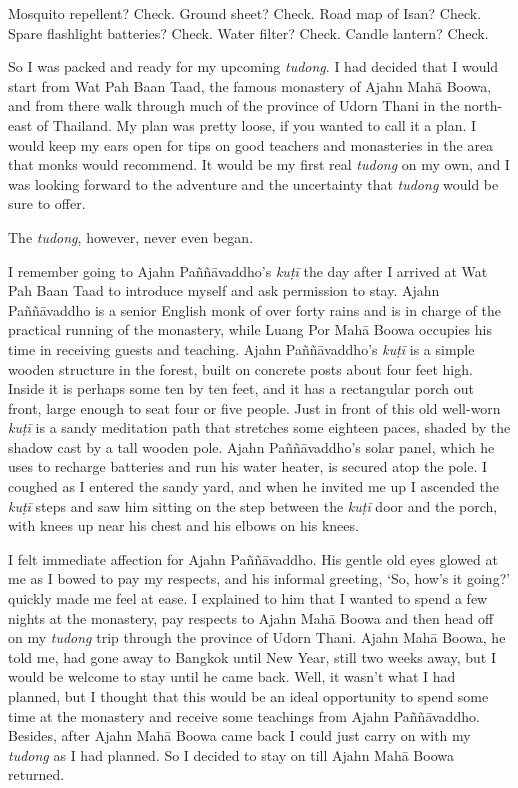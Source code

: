 
Mosquito repellent? Check. Ground sheet? Check. Road map of Isan? Check.
Spare flashlight batteries? Check. Water filter? Check. Candle lantern?
Check.

So I was packed and ready for my upcoming \emph{tudong}. I had decided
that I would start from Wat Pah Baan Taad, the famous monastery of Ajahn
Mahā Boowa, and from there walk through much of the province of Udorn
Thani in the north-east of Thailand. My plan was pretty loose, if you
wanted to call it a plan. I would keep my ears open for tips on good
teachers and monasteries in the area that monks would recommend. It
would be my first real \emph{tudong} on my own, and I was looking
forward to the adventure and the uncertainty that \emph{tudong} would be
sure to offer. 

The \emph{tudong}, however, never even began. 

I remember going to Ajahn Paññāvaddho's \emph{kuṭī} the day after I
arrived at Wat Pah Baan Taad to introduce myself and ask permission to
stay. Ajahn Paññāvaddho is a senior English monk of over forty rains and
is in charge of the practical running of the monastery, while Luang Por
Mahā Boowa occupies his time in receiving guests
and teaching. Ajahn Paññāvaddho's \emph{kuṭī} is a simple wooden
structure in the forest, built on concrete posts about four feet high. 
Inside it is perhaps some ten by ten feet, and it has a rectangular
porch out front, large enough to seat four or five people. Just in front
of this old well-worn \emph{kuṭī} is a sandy meditation path that
stretches some eighteen paces, shaded by the shadow cast by a tall
wooden pole. Ajahn Paññāvaddho's solar panel, which he uses to recharge
batteries and run his water heater, is secured atop the pole. I coughed
as I entered the sandy yard, and when he invited me up I ascended the
\emph{kuṭī} steps and saw him sitting on the step between the
\emph{kuṭī} door and the porch, with knees up near his chest and his
elbows on his knees. 

I felt immediate affection for Ajahn Paññāvaddho. His gentle old eyes
glowed at me as I bowed to pay my respects, and his informal greeting, 
`So, how's it going?' quickly made me feel at ease. I explained to him
that I wanted to spend a few nights at the monastery, pay respects to
Ajahn Mahā Boowa and then head off on my \emph{tudong} trip through the
province of Udorn Thani. Ajahn Mahā Boowa, he told me, had gone away to
Bangkok until New Year, still two weeks away, but I would be welcome to
stay until he came back. Well, it wasn't what I had planned, but I
thought that this would be an ideal opportunity to spend some time at
the monastery and receive some teachings from Ajahn Paññāvaddho. 
Besides, after Ajahn Mahā Boowa came back I could just carry on with my
\emph{tudong} as I had planned. So I decided to stay on till Ajahn Mahā
Boowa returned. 

